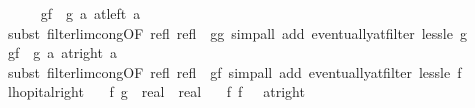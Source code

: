 \begin{isabellebody}
\ \ \ \ \isamarkupfalse%
\ {\isachardoublequoteopen}{\isacharparenleft}{\kern0pt}{\isacharquery}{\kern0pt}gf\ {\isasymlonglongrightarrow}\ g\ a{\isacharparenright}{\kern0pt}\ {\isacharparenleft}{\kern0pt}at{\isacharunderscore}{\kern0pt}left\ a{\isacharparenright}{\kern0pt}{\isachardoublequoteclose}\isanewline
\ \ \ \ \ \ \isamarkupfalse%
\ {\isacharparenleft}{\kern0pt}subst\ filterlim{\isacharunderscore}{\kern0pt}cong{\isacharbrackleft}{\kern0pt}OF\ refl\ refl{\isacharcomma}{\kern0pt}\ \ g{\isacharequal}{\kern0pt}g{\isacharbrackright}{\kern0pt}{\isacharparenright}{\kern0pt}\ {\isacharparenleft}{\kern0pt}simp{\isacharunderscore}{\kern0pt}all\ add{\isacharcolon}{\kern0pt}\ eventually{\isacharunderscore}{\kern0pt}at{\isacharunderscore}{\kern0pt}filter\ less{\isacharunderscore}{\kern0pt}le\ g{\isacharparenright}{\kern0pt}\isanewline
\ \ \ \ \isamarkupfalse%
\ {\isachardoublequoteopen}{\isacharparenleft}{\kern0pt}{\isacharquery}{\kern0pt}gf\ {\isasymlonglongrightarrow}\ g\ a{\isacharparenright}{\kern0pt}\ {\isacharparenleft}{\kern0pt}at{\isacharunderscore}{\kern0pt}right\ a{\isacharparenright}{\kern0pt}{\isachardoublequoteclose}\isanewline
\ \ \ \ \ \ \isamarkupfalse%
\ {\isacharparenleft}{\kern0pt}subst\ filterlim{\isacharunderscore}{\kern0pt}cong{\isacharbrackleft}{\kern0pt}OF\ refl\ refl{\isacharcomma}{\kern0pt}\ \ g{\isacharequal}{\kern0pt}f{\isacharbrackright}{\kern0pt}{\isacharparenright}{\kern0pt}\ {\isacharparenleft}{\kern0pt}simp{\isacharunderscore}{\kern0pt}all\ add{\isacharcolon}{\kern0pt}\ eventually{\isacharunderscore}{\kern0pt}at{\isacharunderscore}{\kern0pt}filter\ less{\isacharunderscore}{\kern0pt}le\ f{\isacharparenright}{\kern0pt}\isanewline
\ \ \isamarkupfalse%
\isanewline
{}\isamarkupfalse%
%
\endisatagproof
{\isafoldproof}%
%
\isadelimproof
\isanewline
%
\endisadelimproof
\isanewline
{}\isamarkupfalse%
\ lhopital{\isacharunderscore}{\kern0pt}right{\isacharunderscore}{\kern0pt}{}{\isacharcolon}{\kern0pt}\isanewline
\ \ \ f{}\ g{}\ {\isacharcolon}{\kern0pt}{\isacharcolon}{\kern0pt}\ {\isachardoublequoteopen}real\ {\isasymRightarrow}\ real{\isachardoublequoteclose}\isanewline
\ \ \ f{\isacharunderscore}{\kern0pt}{}{\isacharcolon}{\kern0pt}\ {\isachardoublequoteopen}{\isacharparenleft}{\kern0pt}f{}\ {\isasymlonglongrightarrow}\ {}{\isacharparenright}{\kern0pt}\ {\isacharparenleft}{\kern0pt}at{\isacharunderscore}{\kern0pt}right\ {}{\isacharparenright}{\kern0pt}{\isachardoublequoteclose}\isanewline

\end{isabellebody}
